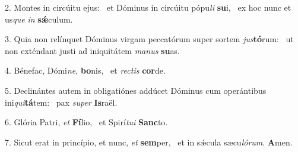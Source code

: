 2. Montes in circúitu ejus: \dag\  et Dóminus in circúitu pópu\textit{li} \textbf{su}i, \ast\  ex hoc nunc et us\textit{que} \textit{in} \textbf{sǽ}culum.\

3. Quia non relínquet Dóminus virgam peccatórum super sortem \textit{jus}\textbf{tó}rum: \ast\  ut non exténdant justi ad iniquitátem \textit{ma}\textit{nus} \textbf{su}as.\

4. Bénefac, Dómi\textit{ne}, \textbf{bo}nis, \ast\  et \textit{rec}\textit{tis} \textbf{cor}de.\

5. Declinántes autem in obligatiónes addúcet Dóminus cum operántibus ini\textit{qui}\textbf{tá}tem: \ast\  pax \textit{su}\textit{per} \textbf{Is}raël.\

6. Glória Patri, \textit{et} \textbf{Fí}lio, \ast\  et Spirí\textit{tu}\textit{i} \textbf{Sanc}to.\

7. Sicut erat in princípio, et nunc, \textit{et} \textbf{sem}per, \ast\  et in sǽcula sæcu\textit{ló}\textit{rum}. \textbf{A}men.\

